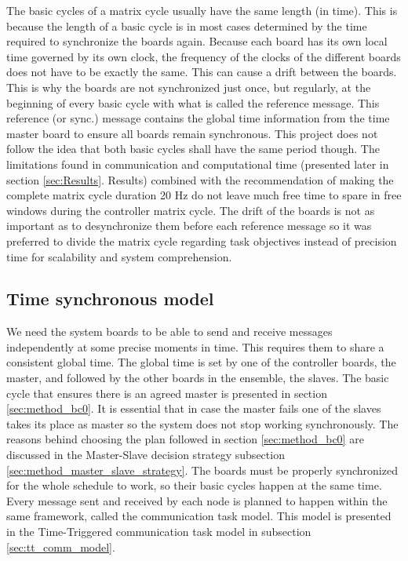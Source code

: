 \documentclass[table,xcdraw]{article}
\begin{document}
The basic cycles of a matrix cycle usually have the same length (in time). This is because the length of a basic cycle is in most cases determined by the time required to synchronize the boards again. Because each board has its own local time governed by its own clock, the frequency of the clocks of the different boards does not have to be exactly the same. This can cause a drift between the boards. This is why the boards are not synchronized just once, but regularly, at the beginning of every basic cycle with what is called the reference message. This reference (or sync.) message contains the global time information from the time master board to ensure all boards remain synchronous. This project does not follow the idea that both basic cycles shall have the same period though. The limitations found in communication and computational time (presented later in section \ref{sec:Results}. Results) combined with the recommendation of making the complete matrix cycle duration 20 Hz do not leave much free time to spare in free windows during the controller matrix cycle. The drift of the boards is not as important as to desynchronize them before each reference message so it was preferred to divide the matrix cycle regarding task objectives instead of precision time for scalability and system comprehension.\\


\subsection{Time synchronous model}\label{sec:time_sync_model}
We need the system boards to be able to send and receive messages independently at some precise moments in time. This requires them to share a consistent global time. The global time is set by one of the controller boards, the master, and followed by the other boards in the ensemble, the slaves. The basic cycle that ensures there is an agreed master is presented in section \ref{sec:method_bc0}. It is essential that in case the master fails one of the slaves takes its place as master so the system does not stop working synchronously. The reasons behind choosing the plan followed in section \ref{sec:method_bc0} are discussed in the Master-Slave decision strategy subsection \ref{sec:method_master_slave_strategy}. The boards must be properly synchronized for the whole schedule to work, so their basic cycles happen at the same time. Every message sent and received by each node is planned to happen within the same framework, called the communication task model. This model is presented in the Time-Triggered communication task model in subsection \ref{sec:tt_comm_model}.
\end{document}
